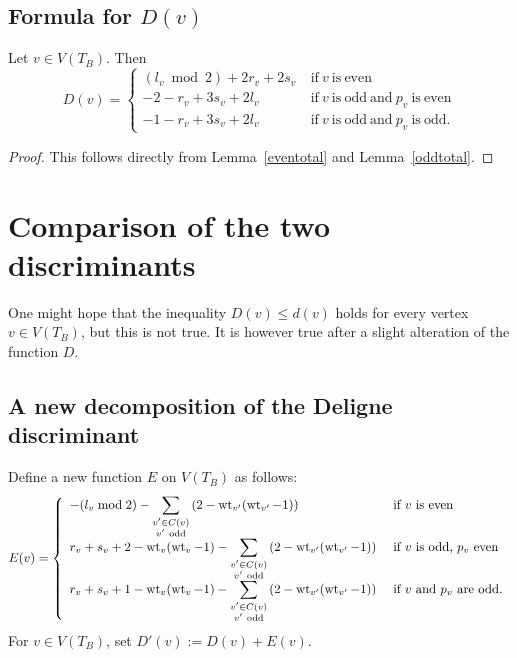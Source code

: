 \subsection{Formula for $D(v)$}
\begin{thm}\label{localDel}
 Let $v \in V(T_B)$. Then 
 \[ D(v) = \left\{ 
 \begin{array}{ll}
 (l_v \bmod 2)+2r_v+2s_v \ &\mathrm{if}\  v\ \mathrm{is \ even} \\
 -2-r_v+3s_v+2l_v \ &\mathrm{if}\ v \ \mathrm{is\ odd \ and}\ p_v\ \mathrm{is\ even} \\                                                                                                                                                                                                                          
 -1-r_v+3s_v+2l_v \ &\mathrm{if}\ v \ \mathrm{is\ odd \ and}\ p_v\ \mathrm{is\ odd}  .
 \end{array}
 \right. \] 
\end{thm}
\begin{proof}
 This follows directly from Lemma~\ref{eventotal} and Lemma~\ref{oddtotal}.
\end{proof}

\section{Comparison of the two discriminants}\label{comparison}
One might hope that the inequality $D(v) \leq d(v)$ holds for every vertex $v \in V(T_B)$, but this is not true. It is however true after a slight alteration of the function $D$. 

\subsection{A new decomposition of the Deligne discriminant}
Define a new function $E$ on $V(T_B)$ as follows:
\[ E(v) = \left\{ { \begin{array}{ll}
            \displaystyle{- (l_v \bmod 2) - \sum_{\substack{v' \in C(v) \\ v' \ \mathrm{odd}}} \left( 2-  \wt_{v'}(\wt_{v'}-1)  \right)} \ &\textup{if $v$ is even} \\
            \displaystyle{r_v + s_v + 2 -  \wt_v(\wt_v-1)  - \sum_{\substack{v' \in C(v) \\ v' \ \mathrm{odd}}} \left( 2-  \wt_{v'}(\wt_{v'}-1) \right)} \ &\textup{if $v$ is odd, $p_v$ even} \\
            \displaystyle{r_v + s_v + 1 -  \wt_v(\wt_v-1)  - \sum_{\substack{v' \in C(v) \\ v' \ \mathrm{odd}}} \left( 2-  \wt_{v'}(\wt_{v'}-1) \right)} \ &\textup{if $v$ and $p_v$ are odd.}
           \end{array} } \right.
 \]
 For $v \in V(T_B)$, set $D'(v) := D(v) +E(v)$.
 
